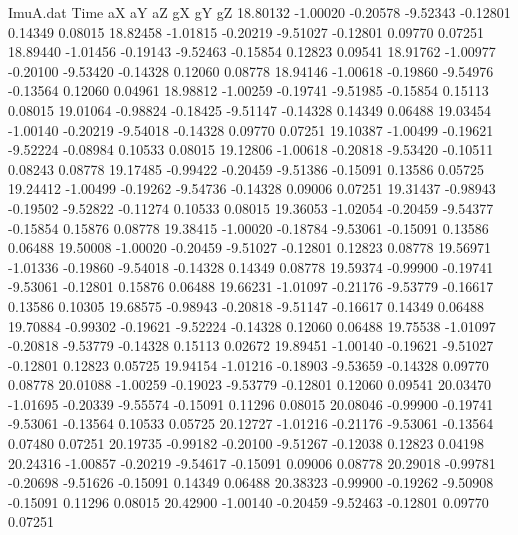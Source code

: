 \begin{filecontents}{ImuA.dat}
Time aX aY aZ gX gY gZ
  18.80132   -1.00020   -0.20578   -9.52343   -0.12801    0.14349    0.08015
  18.82458   -1.01815   -0.20219   -9.51027   -0.12801    0.09770    0.07251
  18.89440   -1.01456   -0.19143   -9.52463   -0.15854    0.12823    0.09541
  18.91762   -1.00977   -0.20100   -9.53420   -0.14328    0.12060    0.08778
  18.94146   -1.00618   -0.19860   -9.54976   -0.13564    0.12060    0.04961
  18.98812   -1.00259   -0.19741   -9.51985   -0.15854    0.15113    0.08015
  19.01064   -0.98824   -0.18425   -9.51147   -0.14328    0.14349    0.06488
  19.03454   -1.00140   -0.20219   -9.54018   -0.14328    0.09770    0.07251
  19.10387   -1.00499   -0.19621   -9.52224   -0.08984    0.10533    0.08015
  19.12806   -1.00618   -0.20818   -9.53420   -0.10511    0.08243    0.08778
  19.17485   -0.99422   -0.20459   -9.51386   -0.15091    0.13586    0.05725
  19.24412   -1.00499   -0.19262   -9.54736   -0.14328    0.09006    0.07251
  19.31437   -0.98943   -0.19502   -9.52822   -0.11274    0.10533    0.08015
  19.36053   -1.02054   -0.20459   -9.54377   -0.15854    0.15876    0.08778
  19.38415   -1.00020   -0.18784   -9.53061   -0.15091    0.13586    0.06488
  19.50008   -1.00020   -0.20459   -9.51027   -0.12801    0.12823    0.08778
  19.56971   -1.01336   -0.19860   -9.54018   -0.14328    0.14349    0.08778
  19.59374   -0.99900   -0.19741   -9.53061   -0.12801    0.15876    0.06488
  19.66231   -1.01097   -0.21176   -9.53779   -0.16617    0.13586    0.10305
  19.68575   -0.98943   -0.20818   -9.51147   -0.16617    0.14349    0.06488
  19.70884   -0.99302   -0.19621   -9.52224   -0.14328    0.12060    0.06488
  19.75538   -1.01097   -0.20818   -9.53779   -0.14328    0.15113    0.02672
  19.89451   -1.00140   -0.19621   -9.51027   -0.12801    0.12823    0.05725
  19.94154   -1.01216   -0.18903   -9.53659   -0.14328    0.09770    0.08778
  20.01088   -1.00259   -0.19023   -9.53779   -0.12801    0.12060    0.09541
  20.03470   -1.01695   -0.20339   -9.55574   -0.15091    0.11296    0.08015
  20.08046   -0.99900   -0.19741   -9.53061   -0.13564    0.10533    0.05725
  20.12727   -1.01216   -0.21176   -9.53061   -0.13564    0.07480    0.07251
  20.19735   -0.99182   -0.20100   -9.51267   -0.12038    0.12823    0.04198
  20.24316   -1.00857   -0.20219   -9.54617   -0.15091    0.09006    0.08778
  20.29018   -0.99781   -0.20698   -9.51626   -0.15091    0.14349    0.06488
  20.38323   -0.99900   -0.19262   -9.50908   -0.15091    0.11296    0.08015
  20.42900   -1.00140   -0.20459   -9.52463   -0.12801    0.09770    0.07251

\end{filecontents}

